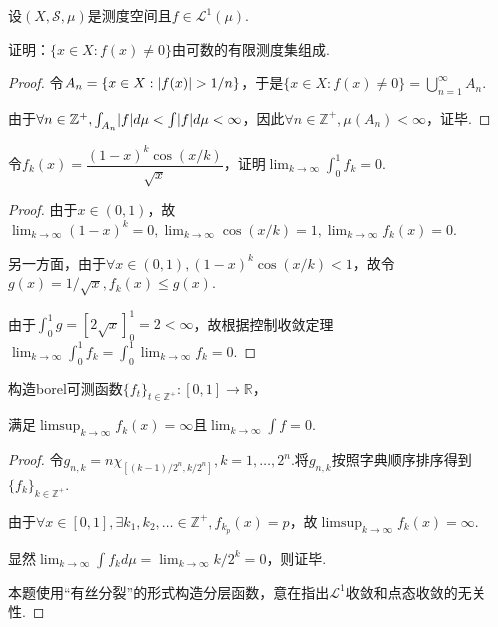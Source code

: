 \begin{problem}[11]\label{3.B.11}
    设\((X, \mathcal{S}, \mu)\)是测度空间且\(f \in \mathcal{L}^1(\mu)\).
    
    证明：\(\{x \in X: f(x) \ne 0\}\)由可数的有限测度集组成.
\end{problem}

\begin{proof}
    令\(A_n=\{x \in X: \abs*{f(x)}>1/n\}\)，于是\(\{x \in X: f(x) \ne 0\}=\bigcup_{n=1}^\infty A_n\).

    由于\(\forall n \in \mathbb{Z}^+, \int_{A_n} \abs*{f} d\mu<\int \abs*{f} d\mu<\infty\)，因此\(\forall n \in \mathbb{Z}^+, \mu(A_n)<\infty\)，证毕.
\end{proof}

\begin{problem}[12]\label{3.B.12}
    令\(f_k(x)=\dfrac{(1-x)^k \cos(x/k)}{\sqrt{x}}\)，证明\(\lim_{k \to \infty} \int_0^1 f_k=0\).
\end{problem}

\begin{proof}
    由于\(x \in (0,1)\)，故\(\lim_{k \to \infty} (1-x)^k=0, \lim_{k \to \infty} \cos(x/k)=1, \lim_{k \to \infty} f_k(x)=0\).

    另一方面，由于\(\forall x \in (0,1), (1-x)^k \cos(x/k)<1\)，故令\(g(x)=1/\sqrt{x}, f_k(x) \leq g(x)\).

    由于\(\int_0^1 g=[2\sqrt{x}]_0^1=2<\infty\)，故根据控制收敛定理\(\lim_{k \to \infty} \int_0^1 f_k=\int_0^1 \lim_{k \to \infty} f_k=0\).
\end{proof}

\begin{problem}[13]\label{3.B.13}
    构造borel可测函数\(\{f_t\}_{t \in \mathbb{Z}^+}: [0,1] \to \mathbb{R}\)，
    
    满足\(\limsup_{k \to \infty} f_k(x)=\infty\)且\(\lim_{k \to \infty} \int f=0\).
\end{problem}

\begin{proof}
    令\(g_{n,k}=n \chi_{[(k-1)/2^n, k/2^n]}, k=1, \dots, 2^n\).将\(g_{n,k}\)按照{\kaishu 字典顺序}排序得到\(\{f_k\}_{k \in \mathbb{Z}^+}\).

    由于\(\forall x \in [0,1], \exists k_1, k_2, \dots \in \mathbb{Z}^+, f_{k_p}(x)=p\)，故\(\limsup_{k \to \infty} f_k(x)=\infty\).
    
    显然\(\lim_{k \to \infty} \int f_k d\mu=\lim_{k \to \infty} k/2^k=0\)，则证毕.

    {\kaishu 本题使用“有丝分裂”的形式构造分层函数，意在指出\(\mathcal{L}^1\)收敛和点态收敛的无关性.}
\end{proof}

